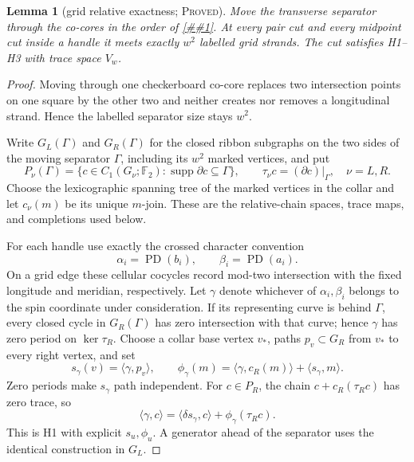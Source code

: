 \documentclass[11pt]{article}
\newcommand{\cref}[1]{\autoref{##1}}%
\newtheorem{lemma}[theorem]{Lemma}
\newcommand{\Ftwo}{\mathbb F_2}
\newcommand{\supp}{\operatorname{supp}}
\newcommand{\claimtag}[1]{\textsc{#1}}
\newcommand{\proved}{\claimtag{Proved}}
\begin{document}
\begin{lemma}[grid relative exactness; \proved]\label{lem:grid-exact}
Move the transverse separator through the co-cores in the order of
\cref{lem:canonical}.  At every pair cut and every midpoint cut inside a
handle it meets exactly \(w^2\) labelled grid strands.  The cut satisfies
H1--H3 with trace space \(V_w\).
\end{lemma}

\begin{proof}
Moving through one checkerboard co-core replaces two intersection points on
one square by the other two and neither creates nor removes a longitudinal
strand.  Hence the labelled separator size stays \(w^2\).

Write \(G_L(\Gamma)\) and \(G_R(\Gamma)\) for the closed ribbon subgraphs on
the two sides of the moving separator \(\Gamma\), including its \(w^2\)
marked vertices, and put
\[
 P_\nu(\Gamma)=\{c\in C_1(G_\nu;\Ftwo):
                  \supp\partial c\subseteq\Gamma\},\qquad
 \tau_\nu c=(\partial c)|_\Gamma,\quad \nu=L,R.
\]
Choose the lexicographic spanning tree of the marked vertices in the collar
and let \(c_\nu(m)\) be its unique \(m\)-join.  These are the relative-chain
spaces, trace maps, and completions used below.

For each handle use exactly the crossed character convention
\begin{equation}\label{eq:grid-character-cochains}
 \alpha_i=\operatorname{PD}(b_i),\qquad
 \beta_i=\operatorname{PD}(a_i).
\end{equation}
On a grid edge these cellular cocycles record mod-two intersection with the
fixed longitude and meridian, respectively.  Let \(\gamma\) denote whichever
of \(\alpha_i,\beta_i\) belongs to the spin coordinate under consideration.
If its representing curve is behind \(\Gamma\), every closed cycle in
\(G_R(\Gamma)\) has zero intersection with that curve; hence
\(\gamma\) has zero period on \(\ker\tau_R\).  Choose a collar base vertex
\(v_*\), paths \(p_v\subset G_R\) from \(v_*\) to every right vertex, and set
\begin{equation}\label{eq:explicit-s-phi}
 s_\gamma(v)=\langle\gamma,p_v\rangle,\qquad
 \phi_\gamma(m)=\langle\gamma,c_R(m)\rangle+\langle s_\gamma,m\rangle .
\end{equation}
Zero periods make \(s_\gamma\) path independent.  For \(c\in P_R\), the chain
\(c+c_R(\tau_Rc)\) has zero trace, so
\[
 \langle\gamma,c\rangle
 =\langle\delta s_\gamma,c\rangle+\phi_\gamma(\tau_Rc).
\]
This is H1 with explicit \(s_u,\phi_u\).  A generator ahead of the separator
uses the identical construction in \(G_L\).


\end{proof}
\end{document}
